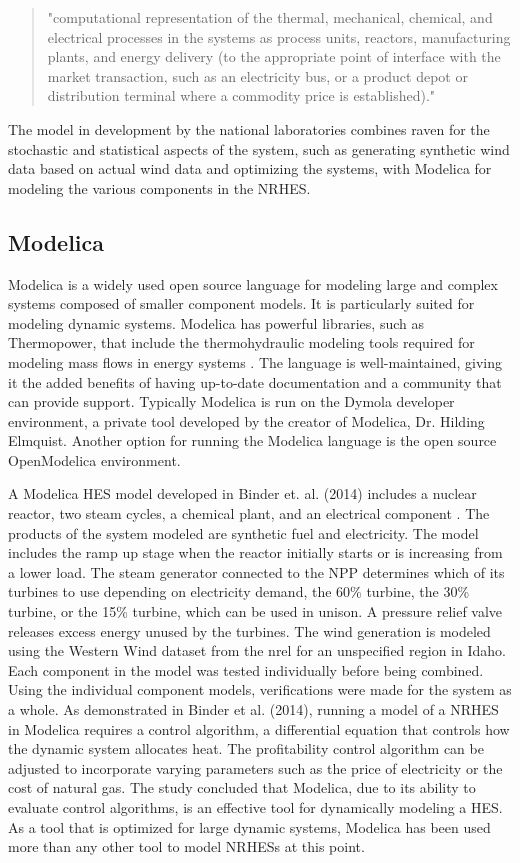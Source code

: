 \begin{quotation}
"computational representation of the thermal, mechanical, chemical, and electrical processes in the systems as process units, reactors, manufacturing plants, and energy delivery (to the appropriate point of interface with the market transaction, such as an electricity bus, or a product depot or distribution terminal where a commodity price is established)\cite{Rabiti2015}."
\end{quotation}

The model in development by the national laboratories combines \ac{raven} for the stochastic and statistical aspects of the system, such as generating synthetic wind data based on actual wind data and optimizing the systems, with Modelica for modeling the various components in the NRHES.

\subsection{Modelica}
Modelica is a widely used open source language for modeling large and complex systems composed of smaller component models. It is particularly suited for modeling dynamic systems. Modelica has powerful libraries, such as Thermopower, that include the thermohydraulic modeling tools required for modeling mass flows in energy systems \cite{Binder2014}. The language is well-maintained, giving it the added benefits of having up-to-date documentation and a community that can provide support. Typically Modelica is run on the Dymola developer environment, a private tool developed by the creator of Modelica, Dr. Hilding Elmquist. Another option for running the Modelica language is the open source OpenModelica environment.

A Modelica HES model developed in Binder et. al. (2014) includes a nuclear reactor, two steam cycles, a chemical plant, and an electrical component \cite{Binder2014}. The products of the system modeled are synthetic fuel and electricity. The model includes the ramp up stage when the reactor initially starts or is increasing from a lower load. The steam generator connected to the NPP determines which of its turbines to use depending on electricity demand, the 60\% turbine, the 30\% turbine, or the 15\% turbine, which can be used in unison. A pressure relief valve releases excess energy unused by the turbines. The wind generation is modeled using the Western Wind dataset from the \ac{nrel} for an unspecified region in Idaho. Each component in the model was tested individually before being combined. Using the individual component models, verifications were made for the system as a whole. As demonstrated in Binder et al. (2014), running a model of a NRHES in Modelica requires a control algorithm, a differential equation that controls how the dynamic system allocates heat. The profitability control algorithm can be adjusted to incorporate varying parameters such as the price of electricity or the cost of natural gas. The study concluded that Modelica, due to its ability to evaluate control algorithms, is an effective tool for dynamically modeling a HES. As a tool that is optimized for large dynamic systems, Modelica has been used more than any other tool to model NRHESs at this point.

